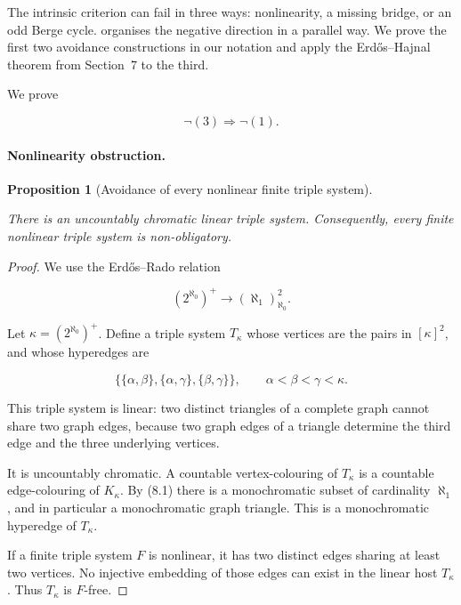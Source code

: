 \documentclass[a4paper,11pt,reqno]{amsart}
\theoremstyle{plain}
\newtheorem{proposition}[theorem]{Proposition}
\theoremstyle{definition}
\theoremstyle{remark}
\begin{document}
The intrinsic criterion can fail in three ways: nonlinearity, a missing
bridge, or an odd Berge cycle.  \citet[Sections~2--4]{li2026} organises the
negative direction in a parallel way.  We prove the first two avoidance
constructions in our notation and apply the Erdős--Hajnal theorem from
Section~7 to the third.

We prove

\[
\neg(3)\Longrightarrow\neg(1).
\]

\paragraph{Nonlinearity obstruction.}\label{nonlinearity-obstruction}

\begin{proposition}[Avoidance of every nonlinear finite triple system]\label{proposition-8.1-avoidance-of-every-nonlinear-finite-triple-system}

There is an uncountably chromatic linear triple system. Consequently, every finite nonlinear triple system is non-obligatory.

\end{proposition}
\begin{proof}
We use the Erd\H{o}s--Rado relation
\citep[Theorem~4(i), formula~(95), p.~471]{erdosrado1956}

\[
(2^{\aleph_0})^+\longrightarrow(\aleph_1)^2_{\aleph_0}. \tag{8.1}
\]

Let \(\kappa=(2^{\aleph_0})^+\). Define a triple system \(T_\kappa\) whose vertices are the pairs in \([\kappa]^2\), and whose hyperedges are

\[
\bigl\{
\{\alpha,\beta\},
\{\alpha,\gamma\},
\{\beta,\gamma\}
\bigr\},
\qquad \alpha<\beta<\gamma<\kappa.
\]

This triple system is linear: two distinct triangles of a complete graph cannot share two graph edges, because two graph edges of a triangle determine the third edge and the three underlying vertices.

It is uncountably chromatic. A countable vertex-colouring of \(T_\kappa\) is a countable edge-colouring of \(K_\kappa\). By (8.1) there is a monochromatic subset of cardinality \(\aleph_1\), and in particular a monochromatic graph triangle. This is a monochromatic hyperedge of \(T_\kappa\).

If a finite triple system \(F\) is nonlinear, it has two distinct edges sharing at least two vertices. No injective embedding of those edges can exist in the linear host \(T_\kappa\). Thus \(T_\kappa\) is \(F\)-free.
\end{proof}
\end{document}
